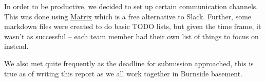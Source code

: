 \documentclass{article}
\begin{document}
In order to be productive, we decided to set up certain communication channels.
This was done using \href{https://matrix.org/}{Matrix} which is a free
alternative to Slack. Further, some markdown files were created to do basic
TODO lists, but given the time frame, it wasn't as successful -- each team
member had their own list of things to focus on instead.

We also met quite frequently as the deadline for submission approached, this
is true as of writing this report as we all work together in Burnside
basement.

\nocite{*}

{}

\end{document}
